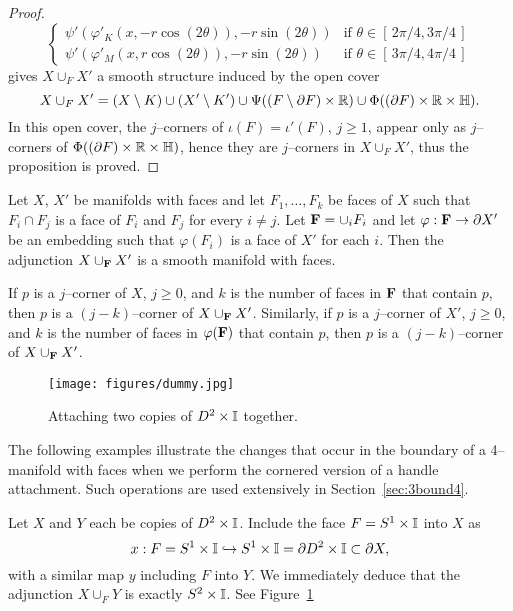 \begin{proof}
\[\begin{cases}
			\psi'(\varphi'_K(x,-r\cos(2\theta)),-r\sin(2\theta))				
				&	\mbox{if } \theta\in[\,2\pi/4,3\pi/4\,]	\\
			\psi'(\varphi'_M(x,r\cos(2\theta)),-r\sin(2\theta))				
				&	\mbox{if } \theta\in[\,3\pi/4,4\pi/4\,]
		\end{cases}	
	\]
	gives $X\cup_F X'$ a smooth structure induced by the open cover
	\[
		X\cup_F X'=(X\setminus K)\cup(X'\setminus K')\cup\Psi((F\setminus\partial F)\times\mathbb{R})\cup	\Phi((\partial F)\times\mathbb{R}\times\mathbb{H}).
	\]
	In this open cover, the $j$--corners of $\iota(F)=\iota'(F)$, $j\geq 1$, appear only as $j$--corners of $\Phi((\partial F)\times\mathbb{R}\times\mathbb{H})$, hence they are $j$--corners in $X\cup_F X'$, thus the proposition is proved.
\end{proof}

\begin{cor}
	\label{cor:addfaces}
	Let $X$, $X'$ be manifolds with faces and let $F_1,\dots, F_k$ be faces of $X$ such that $F_i\cap F_j$ is a face of $F_i$ and $F_j$ for every $i\neq j$.
	Let ${\bf F}=\cup_i F_i$ and let $\varphi:{\bf F}\to \partial X'$ be an embedding such that $\varphi(F_i)$ is a face of $X'$ for each $i$.
	Then the adjunction $X \cup_{\bf F} X'$ is a smooth manifold with faces.
		
	If $p$ is a $j$--corner of $X$, $j\geq 0$, and $k$ is the number of faces in ${\bf F}$ that contain $p$, then $p$ is a $(j-k)$--corner of $X\cup_{\bf F} X'$.
	Similarly, if $p$ is a $j$--corner of $X'$, $j\geq 0$, and $k$ is the number of faces in $\varphi({\bf F})$ that contain $p$, then $p$ is a $(j-k)$--corner of $X\cup_{\bf F} X'$.
\end{cor}

\begin{figure}[H]
	\centering
	\caption{Attaching two copies of $D^2\times\mathbb{I}$ together.}
	\texttt{[image: figures/dummy.jpg]}
	\label{fig:DxIuDxI}
\end{figure}

The following examples illustrate the changes that occur in the boundary of a 4--manifold with faces when we perform the cornered version of a handle attachment.
Such operations are used extensively in Section~\ref{sec:3bound4}.

\begin{ex}
	\label{ex:DxIuDxI}
	Let $X$ and $Y$ each be copies of $D^2\times\mathbb{I}$.
	Include the face $F=S^1\times\mathbb{I}$ into $X$ as
	\[
	x:F= S^1\times\mathbb{I}\hookrightarrow S^1\times\mathbb{I}=\partial D^2 \times\mathbb{I}\subset \partial X,
	\]
	with a similar map $y$ including $F$ into $Y$.
	We immediately deduce that the adjunction $X\cup_F Y$ is exactly $S^2\times\mathbb{I}$.
	See Figure~\ref{fig:DxIuDxI}
\end{ex}

